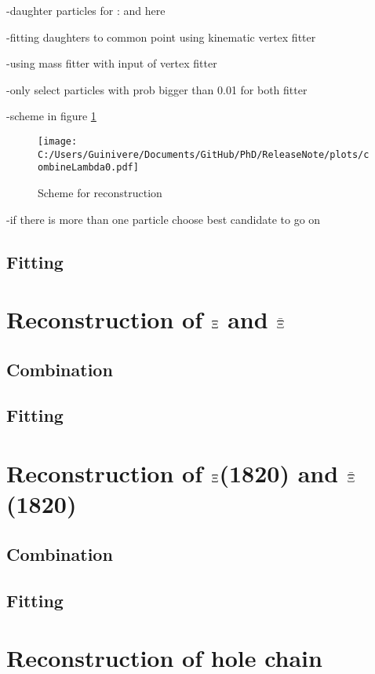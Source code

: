 		-daughter particles for \alam: \antiproton and \piplus here \piplus2 
		
		-fitting daughters to common point using kinematic vertex fitter
		
		-using mass fitter with input of vertex fitter 
		
		-only select particles with prob bigger than 0.01 for both fitter
		
		-scheme in figure \ref{fig:lambda_scheme}
		
		\begin{figure}
			\centering
				\texttt{[image: C:/Users/Guinivere/Documents/GitHub/PhD/ReleaseNote/plots/combineLambda0.pdf]}
			\caption{Scheme for \lam reconstruction}
			\label{fig:lambda_scheme}
		\end{figure}
		
		-if there is more than one particle choose best candidate to go on
		
	\subsection{Fitting}
	
\section{Reconstruction of $\boldmath{\Xi}$ and $\boldmath{\bar{\Xi}}$}
	\subsection{Combination}
	\subsection{Fitting}

\section{Reconstruction of $\boldmath{\Xi}$(1820) and $\boldmath{\bar{\Xi}}$(1820)}
	\subsection{Combination}
	\subsection{Fitting}
	
\section{Reconstruction of hole chain}